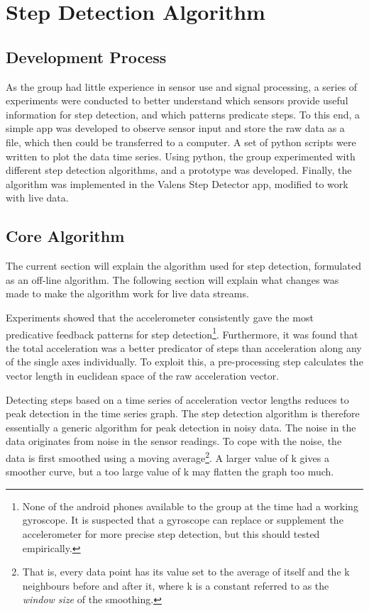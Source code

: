 \section{Step Detection Algorithm}

\subsection{Development Process}
As the group had little experience in sensor use and signal processing, a series of experiments were conducted to better understand which sensors provide useful information for step detection, and which patterns predicate steps. To this end, a simple app was developed to observe sensor input and store the raw data as a file, which then could be transferred to a computer. A set of python scripts were written to plot  the data time series. Using python, the group experimented with different step detection algorithms, and a prototype was developed. Finally, the algorithm was implemented in the Valens Step Detector app, modified to work with live data.

\subsection{Core Algorithm}
The current section will explain the algorithm used for step detection, formulated as an off-line algorithm. The following section will explain what changes was made to make the algorithm work for live data streams.

Experiments showed that the accelerometer consistently gave the most predicative feedback patterns for step detection\footnote{None of the android phones available to the group at the time had a working gyroscope. It is suspected that a gyroscope can replace or supplement the accelerometer for more precise step detection, but this should tested empirically.}. Furthermore, it was found that the total acceleration was a better predicator of steps than acceleration along any of the single axes individually. To exploit this, a pre-processing step calculates the vector length in euclidean space of the raw acceleration vector.

Detecting steps based on a time series of acceleration vector lengths reduces to peak detection in the time series graph. The step detection algorithm is therefore essentially a generic algorithm for peak detection in noisy data. The noise in the data originates from noise in the sensor readings. To cope with the noise, the data is first smoothed using a moving average\footnote{That is, every data point has its value set to the average of itself and the k neighbours before and after it, where k is a constant referred to as the \emph{window size} of the smoothing.}. A larger value of k gives a smoother curve, but a too large value of k may flatten the graph too much.

